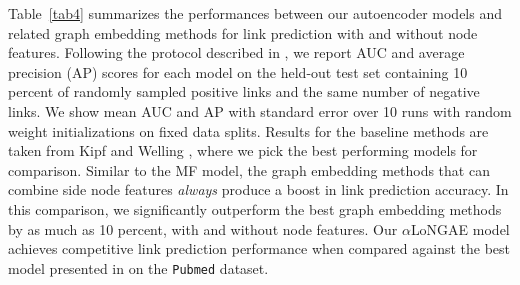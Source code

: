 \documentclass[letterpaper, conference]{IEEEtran}  %
\begin{document}
Table~\ref{tab4} summarizes the performances between our autoencoder models and related graph embedding methods for link prediction with and without node features. Following the protocol described in \cite{VGAE:2016}, we report AUC and average precision (AP) scores for each model on the held-out test set containing 10 percent of randomly sampled positive links and the same number of negative links. We show mean AUC and AP with standard error over 10 runs with random weight initializations on fixed data splits. Results for the baseline methods are taken from Kipf and Welling \cite{VGAE:2016}, where we pick the best performing models for comparison. Similar to the MF model, the graph embedding methods that can combine side node features \emph{always} produce a boost in link prediction accuracy. In this comparison, we significantly outperform the best graph embedding methods by as much as 10 percent, with and without node features. Our $\alpha$LoNGAE model achieves competitive link prediction performance when compared against the best model presented in \cite{VGAE:2016} on the \texttt{Pubmed} dataset.
\end{document}
